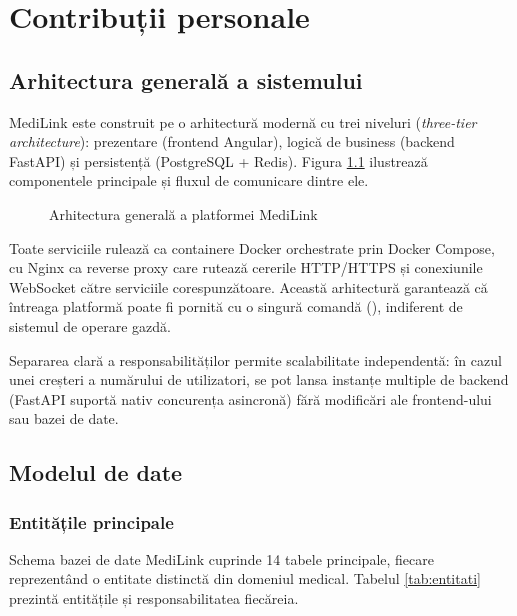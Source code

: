 \chapter{Contribuții personale}

\section{Arhitectura generală a sistemului}

MediLink este construit pe o arhitectură modernă cu trei niveluri (\textit{three-tier architecture}): prezentare (frontend Angular), logică de business (backend FastAPI) și persistență (PostgreSQL + Redis). Figura \ref{fig:arhitectura} ilustrează componentele principale și fluxul de comunicare dintre ele.

\begin{figure}[H]
  \centering
  \caption{Arhitectura generală a platformei MediLink}
  \label{fig:arhitectura}
\end{figure}

Toate serviciile rulează ca containere Docker orchestrate prin Docker Compose, cu Nginx ca reverse proxy care rutează cererile HTTP/HTTPS și conexiunile WebSocket către serviciile corespunzătoare. Această arhitectură garantează că întreaga platformă poate fi pornită cu o singură comandă (), indiferent de sistemul de operare gazdă.

Separarea clară a responsabilităților permite scalabilitate independentă: în cazul unei creșteri a numărului de utilizatori, se pot lansa instanțe multiple de backend (FastAPI suportă nativ concurența asincronă) fără modificări ale frontend-ului sau bazei de date.

\section{Modelul de date}

\subsection{Entitățile principale}

Schema bazei de date MediLink cuprinde 14 tabele principale, fiecare reprezentând o entitate distinctă din domeniul medical. Tabelul \ref{tab:entitati} prezintă entitățile și responsabilitatea fiecăreia.

